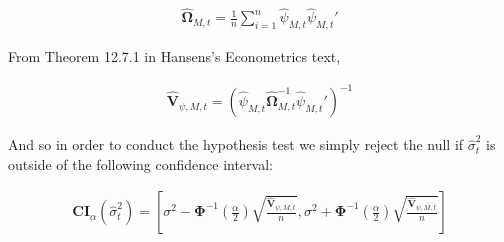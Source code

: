 \documentclass[12pt]{article}
\newcommand{\qsum}{\sum\limits_{i=1}^n}
\begin{document}
\begin{align*}
  \hat{\mathbf{\Omega}}_{M,t}  = \frac{1}{n} \qsum \hat \psi_{M,t} \hat\psi_{M,t}'
\end{align*}

From Theorem 12.7.1 in Hansens's Econometrics text,

\begin{align*}
  \mathbf{\hat{V}}_{\psi,M,t} = (\hat \psi_{M,t} \hat{\mathbf{\Omega}}_{M,t}^{-1}   \hat\psi_{M,t}')^{-1}
\end{align*}

And so in order to conduct the hypothesis test we simply reject the null if $\hat\sigma_t^2$ is outside of the following confidence interval:

\begin{align*}
\mathbf{CI}_{\alpha} (\hat\sigma_t^2) = \left[\sigma^2  - \mathbf{\Phi}^{-1}(\frac{\alpha}{2}) \sqrt{\frac{\mathbf{\hat{V}}_{\psi,M,t}}{n}}   , \sigma^2  + \mathbf{\Phi}^{-1}(\frac{\alpha}{2}) \sqrt{\frac{\mathbf{\hat{V}}_{\psi,M,t}}{n}}  \right]
\end{align*}



\section{}
\section{}
\subsection{}
\end{document}
